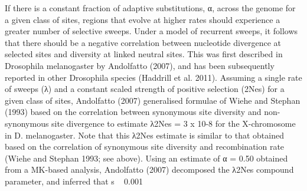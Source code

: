 If there is a constant fraction of adaptive substitutions, α, across the genome for a given class of sites, regions that evolve at higher rates should experience a greater number of selective sweeps. Under a model of recurrent sweeps, it follows that there should be a negative correlation between nucleotide divergence at selected sites and diversity at linked neutral sites. This was first described in Drosophila melanogaster by Andolfatto (2007), and has been subsequently reported in other Drosophila species (Haddrill et al. 2011). Assuming a single rate of sweeps (λ) and a constant scaled strength of positive selection (2Nes) for a given class of sites, Andolfatto (2007) generalised formulae of Wiehe and Stephan (1993) based on the correlation between synonymous site diversity and non-synonymous site divergence to estimate  λ2Nes = 3 x 10-8 for the X-chromosome in D. melanogaster. Note that this λ2Nes estimate is similar to that obtained based on the correlation of synonymous site diversity and recombination rate (Wiehe and Stephan 1993; see above). Using an estimate of α = 0.50 obtained from a MK-based analysis, Andolfatto (2007) decomposed the λ2Nes compound parameter, and inferred that s ~ 0.001%